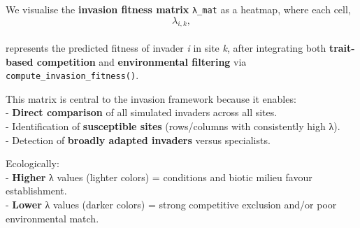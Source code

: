 \documentclass[
]{article}
\begin{document}
We visualise the \textbf{invasion fitness matrix} \texttt{λ\_mat} as a
heatmap, where each cell,\\
\[
\lambda_{i,k},
\]\\
represents the predicted fitness of invader \emph{i} in site \emph{k},
after integrating both \textbf{trait-based competition} and
\textbf{environmental filtering} via
\texttt{compute\_invasion\_fitness()}.

This matrix is central to the invasion framework because it enables:\\
- \textbf{Direct comparison} of all simulated invaders across all
sites.\\
- Identification of \textbf{susceptible sites} (rows/columns with
consistently high λ).\\
- Detection of \textbf{broadly adapted invaders} versus specialists.

Ecologically:\\
- \textbf{Higher} λ values (lighter colors) = conditions and biotic
milieu favour establishment.\\
- \textbf{Lower} λ values (darker colors) = strong competitive exclusion
and/or poor environmental match.
\end{document}
